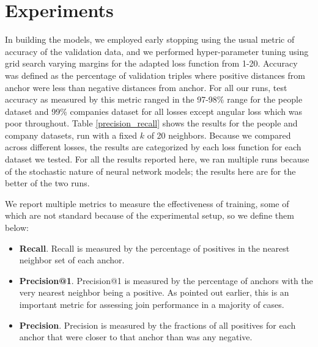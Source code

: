 \section{Experiments}
\label{results}
In building the models, we employed early stopping using the usual metric of accuracy of the validation data, and we performed hyper-parameter tuning using grid search varying margins for the adapted loss function from 1-20.  Accuracy was defined as the percentage of validation triples where positive distances from anchor were less than negative distances from anchor.  For all our runs, test accuracy as measured by this metric ranged in the 97-98\% range for the people dataset and 99\% companies dataset for all losses except angular loss which was poor throughout.  Table \ref{precision_recall} shows the results for the people and company datasets, run with a fixed $k$ of 20 neighbors.  Because we compared across different losses, the results are categorized by each loss function for each dataset we tested.  For all the results reported here, we ran multiple runs because of the stochastic nature of neural network models; the results here are for the better of the two runs. 

We report multiple metrics to measure the effectiveness of training, some of which are not standard because of the experimental setup, so we define them below:
\begin{itemize}
\item \textbf{Recall}.  Recall is measured by the percentage of positives in the nearest neighbor set of each anchor.
\item \textbf{Precision@1}.  Precision@1 is measured by the percentage of anchors with the very nearest neighbor being a positive.  As pointed out earlier, this is an important metric for assessing join performance in a majority of cases.
\item \textbf{Precision}.  Precision is measured by the fractions of all positives for each anchor that were closer to that anchor than was any negative.
\end{itemize}
 
